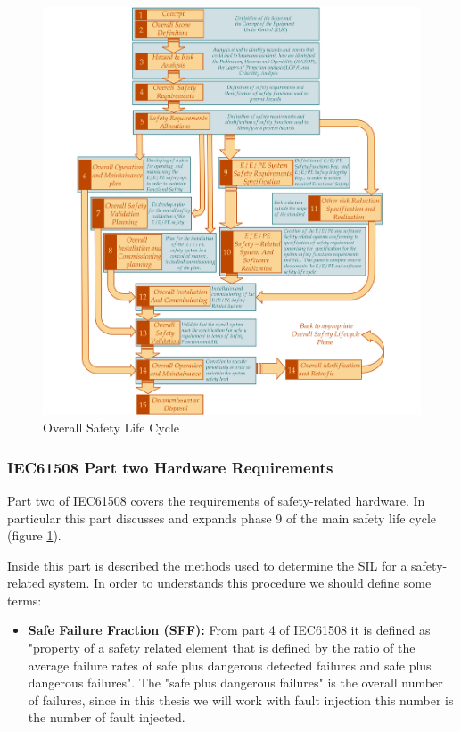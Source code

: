 {{{{			   \begin{figure}[H]
    				\centering
    				\includegraphics[scale=0.19,center]{./images/SafetyLifeCycle.png}
    				\caption{Overall Safety Life Cycle}
			    	\label{fig:FirstPartOfSafetyLifeCycle}
			    \end{figure} 
		    
		    }
		    \subsubsection{IEC61508 Part two Hardware Requirements} {
		        Part two of IEC61508 covers the requirements of safety-related hardware. In particular this part discusses and expands phase 9 of the main safety life cycle (figure \ref{fig:FirstPartOfSafetyLifeCycle}).
		        
		        Inside this part is described the methods used to determine the SIL for a safety-related system. In order to understands this procedure we should define some terms:
		        \begin{itemize}
		            \item \textbf{Safe Failure Fraction (SFF):} From part 4 of IEC61508 it is defined as "property of a safety related element that is defined by the ratio of the average failure rates of safe plus dangerous detected failures and safe plus dangerous failures". The "safe plus dangerous failures" is the overall number of failures, since in this thesis we will work with fault injection this number is the number of fault injected.
		            

\end{itemize}}}}}
